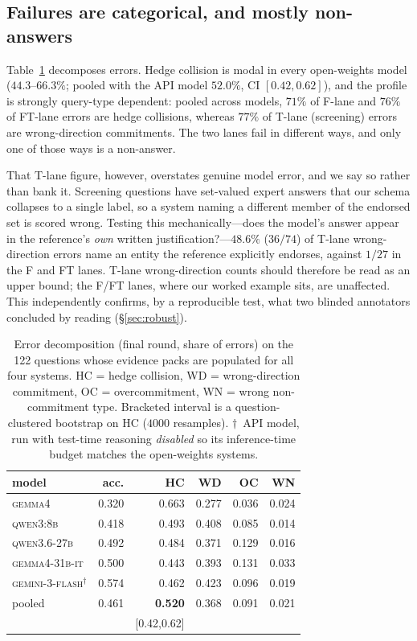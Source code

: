 \documentclass[sigconf,anonymous,review]{acmart}
\begin{document}
\subsection{Failures are categorical, and mostly non-answers}

Table~\ref{tab:decomp} decomposes errors. Hedge collision is modal in every
open-weights model ($44.3$--$66.3\%$; pooled with the API model $52.0\%$, CI
$[0.42,0.62]$), and the profile
is strongly query-type dependent: pooled across models, $71\%$ of F-lane and
$76\%$ of FT-lane errors are hedge collisions, whereas $77\%$ of T-lane
(screening) errors are wrong-direction commitments. The two lanes fail in
different ways, and only one of those ways is a non-answer.

That T-lane figure, however, overstates genuine model error, and we say so
rather than bank it. Screening questions have set-valued expert answers that
our schema collapses to a single label, so a system naming a different member
of the endorsed set is scored wrong. Testing this mechanically---does the
model's answer appear in the reference's \emph{own} written
justification?---$48.6\%$ ($36/74$) of T-lane wrong-direction errors name an
entity the reference explicitly endorses, against $1/27$ in the F and FT
lanes. T-lane wrong-direction counts should therefore be read as an upper
bound; the F/FT lanes, where our worked example sits, are unaffected. This
independently confirms, by a reproducible test, what two blinded annotators
concluded by reading (\S\ref{sec:robust}).

\begin{table}[t]
\caption{Error decomposition (final round, share of errors) on the 122
questions whose evidence packs are populated for all four systems. HC =
hedge collision, WD = wrong-direction commitment, OC = overcommitment, WN =
wrong non-commitment type. Bracketed interval is a question-clustered
bootstrap on HC ($4000$ resamples). $\dagger$~API model, run with test-time reasoning \emph{disabled} so its inference-time budget matches the open-weights systems.}
\label{tab:decomp}
\small
\begin{tabular}{lrrrrr}
\toprule
model & acc. & HC & WD & OC & WN \\
\midrule
\textsc{gemma4}        & 0.320 & 0.663 & 0.277 & 0.036 & 0.024 \\
\textsc{qwen3:8b}      & 0.418 & 0.493 & 0.408 & 0.085 & 0.014 \\
\textsc{qwen3.6-27b}   & 0.492 & 0.484 & 0.371 & 0.129 & 0.016 \\
\textsc{gemma4-31b-it} & 0.500 & 0.443 & 0.393 & 0.131 & 0.033 \\
\textsc{gemini-3-flash}$^\dagger$ & 0.574 & 0.462 & 0.423 & 0.096 & 0.019 \\
\midrule
pooled & 0.461 & \textbf{0.520} & 0.368 & 0.091 & 0.021 \\
       &       & \small[0.42,0.62] & & & \\
\bottomrule
\end{tabular}
\end{table}
\end{document}
